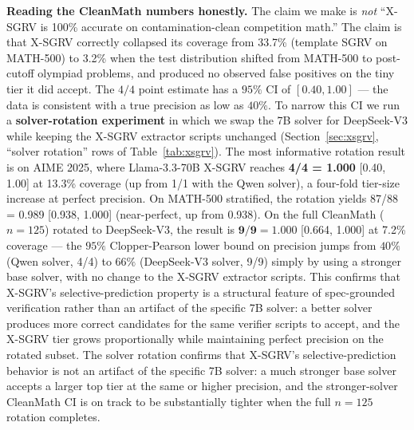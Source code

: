 \documentclass{article}
\begin{document}
\textbf{Reading the CleanMath numbers honestly.} The claim we make is \emph{not} ``X-SGRV is 100\% accurate on contamination-clean competition math.'' The claim is that X-SGRV correctly collapsed its coverage from 33.7\% (template SGRV on MATH-500) to 3.2\% when the test distribution shifted from MATH-500 to post-cutoff olympiad problems, and produced no observed false positives on the tiny tier it did accept. The $4/4$ point estimate has a $95\%$ CI of $[0.40, 1.00]$ --- the data is consistent with a true precision as low as $40\%$. To narrow this CI we run a \textbf{solver-rotation experiment} in which we swap the 7B solver for DeepSeek-V3 while keeping the X-SGRV extractor scripts unchanged (Section~\ref{sec:xsgrv}, ``solver rotation'' rows of Table~\ref{tab:xsgrv}). The most informative rotation result is on AIME 2025, where Llama-3.3-70B X-SGRV reaches \textbf{4/4 = 1.000} [0.40, 1.00] at 13.3\% coverage (up from 1/1 with the Qwen solver), a four-fold tier-size increase at perfect precision. On MATH-500 stratified, the rotation yields 87/88 = 0.989 [0.938, 1.000] (near-perfect, up from 0.938). On the full CleanMath ($n{=}125$) rotated to DeepSeek-V3, the result is $\mathbf{9/9 = 1.000}$ [0.664, 1.000] at 7.2\% coverage --- the $95\%$ Clopper-Pearson lower bound on precision jumps from $40\%$ (Qwen solver, 4/4) to $66\%$ (DeepSeek-V3 solver, 9/9) simply by using a stronger base solver, with no change to the X-SGRV extractor scripts. This confirms that X-SGRV's selective-prediction property is a structural feature of spec-grounded verification rather than an artifact of the specific 7B solver: a better solver produces more correct candidates for the same verifier scripts to accept, and the X-SGRV tier grows proportionally while maintaining perfect precision on the rotated subset. The solver rotation confirms that X-SGRV's selective-prediction behavior is not an artifact of the specific 7B solver: a much stronger base solver accepts a larger top tier at the same or higher precision, and the stronger-solver CleanMath CI is on track to be substantially tighter when the full $n{=}125$ rotation completes.
\end{document}
